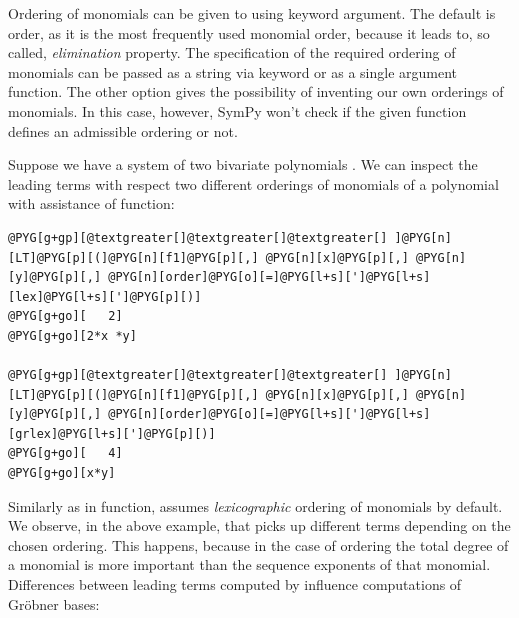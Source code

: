 Ordering of monomials can be given to  using  keyword argument. The default
is  order, as it is the most frequently used monomial order, because it leads to, so called,
\emph{elimination} property. The specification of the required ordering of monomials can be passed as a
string via  keyword or as a single argument function. The other option gives the possibility
of inventing our own orderings of monomials. In this case, however, SymPy won't check if the given
function defines an admissible ordering or not.

Suppose we have a system of two bivariate polynomials .
We can inspect the leading terms with respect two different orderings of monomials of a polynomial with
assistance of  function:

\begin{Verbatim}[commandchars=@\[\]]
@PYG[g+gp][@textgreater[]@textgreater[]@textgreater[] ]@PYG[n][LT]@PYG[p][(]@PYG[n][f1]@PYG[p][,] @PYG[n][x]@PYG[p][,] @PYG[n][y]@PYG[p][,] @PYG[n][order]@PYG[o][=]@PYG[l+s][']@PYG[l+s][lex]@PYG[l+s][']@PYG[p][)]
@PYG[g+go][   2]
@PYG[g+go][2*x *y]

@PYG[g+gp][@textgreater[]@textgreater[]@textgreater[] ]@PYG[n][LT]@PYG[p][(]@PYG[n][f1]@PYG[p][,] @PYG[n][x]@PYG[p][,] @PYG[n][y]@PYG[p][,] @PYG[n][order]@PYG[o][=]@PYG[l+s][']@PYG[l+s][grlex]@PYG[l+s][']@PYG[p][)]
@PYG[g+go][   4]
@PYG[g+go][x*y]
\end{Verbatim}
\noindent
Similarly as in  function,  assumes \emph{lexicographic} ordering  of monomials by
default. We observe, in the above example, that  picks up different terms depending on the
chosen ordering. This happens, because in the case of  ordering the total degree of a monomial
is more important than the sequence exponents of that monomial. Differences between leading terms computed
by  influence computations of Gröbner bases:

